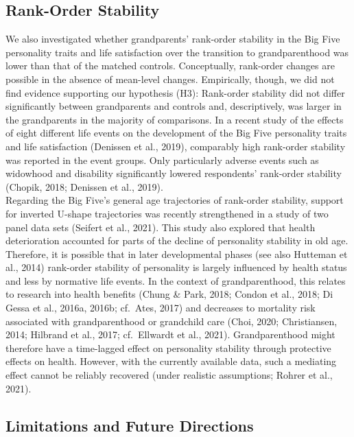 \documentclass[
  english,
  man,floatsintext]{apa7}
\begin{document}
\hypertarget{rank-order-stability-1}{%
\subsection{Rank-Order Stability}\label{rank-order-stability-1}}

We also investigated whether grandparents' rank-order stability in the Big Five personality traits and life satisfaction over the transition to grandparenthood was lower than that of the matched controls. Conceptually, rank-order changes are possible in the absence of mean-level changes. Empirically, though, we did not find evidence supporting our hypothesis (H3): Rank-order stability did not differ significantly between grandparents and controls and, descriptively, was larger in the grandparents in the majority of comparisons. In a recent study of the effects of eight different life events on the development of the Big Five personality traits and life satisfaction (Denissen et al., 2019), comparably high rank-order stability was reported in the event groups. Only particularly adverse events such as widowhood and disability significantly lowered respondents' rank-order stability (Chopik, 2018; Denissen et al., 2019).\\
Regarding the Big Five's general age trajectories of rank-order stability, support for inverted U-shape trajectories was recently strengthened in a study of two panel data sets (Seifert et al., 2021). This study also explored that health deterioration accounted for parts of the decline of personality stability in old age. Therefore, it is possible that in later developmental phases (see also Hutteman et al., 2014) rank-order stability of personality is largely influenced by health status and less by normative life events. In the context of grandparenthood, this relates to research into health benefits (Chung \& Park, 2018; Condon et al., 2018; Di Gessa et al., 2016a, 2016b; cf.~Ates, 2017) and decreases to mortality risk associated with grandparenthood or grandchild care (Choi, 2020; Christiansen, 2014; Hilbrand et al., 2017; cf.~Ellwardt et al., 2021). Grandparenthood might therefore have a time-lagged effect on personality stability through protective effects on health. However, with the currently available data, such a mediating effect cannot be reliably recovered (under realistic assumptions; Rohrer et al., 2021).

\hypertarget{limitations-and-future-directions}{%
\subsection{Limitations and Future Directions}\label{limitations-and-future-directions}}
\end{document}
